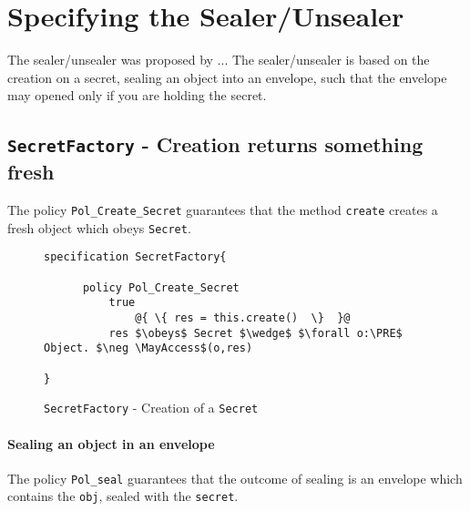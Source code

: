 \documentclass{llncs}
\newcommand{\prg}[1]{{\mbox{\tt{#1}}}}
\begin{document}
\section{Specifying the Sealer/Unsealer}



The sealer/unsealer was proposed by ...  The sealer/unsealer is based on the creation on a secret, sealing an object into an envelope, such that the envelope may opened only if you are holding the secret.  


\subsection{\prg{SecretFactory} - Creation returns something fresh}

The policy \prg{Pol\_Create\_Secret} guarantees that the method \prg{create} creates a fresh object which obeys \prg{Secret}.

\begin{figure}[htb]
\begin{lstlisting}[escapechar=@]
specification SecretFactory{

      policy Pol_Create_Secret
          true
      	      @{ \{ res = this.create()  \}  }@
          res $\obeys$ Secret $\wedge$ $\forall o:\PRE$ Object. $\neg \MayAccess$(o,res)
	
}
\end{lstlisting}
\caption{\prg{SecretFactory} -  Creation of a \prg{Secret}}
\label{fig:SpecSecret}
\end{figure}


\paragraph{Sealing an object in an envelope}
The policy \prg{Pol\_seal} guarantees that the outcome of sealing is an envelope which contains the \prg{obj}, sealed with the \prg{secret}. 
\end{document}
